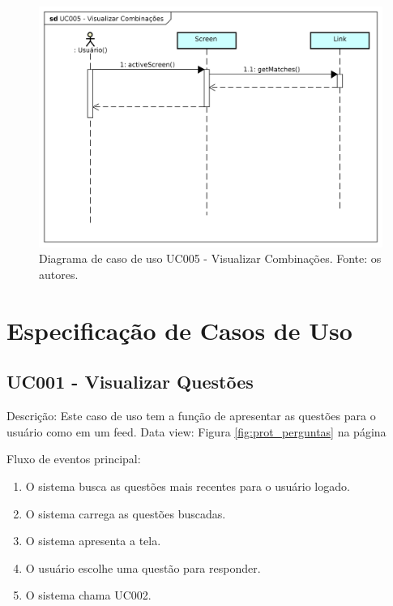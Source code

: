 \begin{figure}[!htb]
\centering
\includegraphics[width=16cm]{UC005-VisualizarCombinacoes.png}
\caption{Diagrama de caso de uso UC005 - Visualizar Combinações. Fonte: os autores.}
\label{fig:UC005}
\end{figure}

\section{Especificação de Casos de Uso}

\subsection*{UC001 - Visualizar Questões}

Descrição: Este caso de uso tem a função de apresentar as questões para o usuário como em um feed.
Data view: Figura \ref{fig:prot_perguntas} na página \pageref{fig:prot_perguntas}

Fluxo de eventos principal:

\begin{enumerate}

\item O sistema busca as questões mais recentes para o usuário logado.
\item O sistema carrega as questões buscadas.
\item O sistema apresenta a tela.
\item O usuário escolhe uma questão para responder.
\item O sistema chama UC002.

\end{enumerate}

